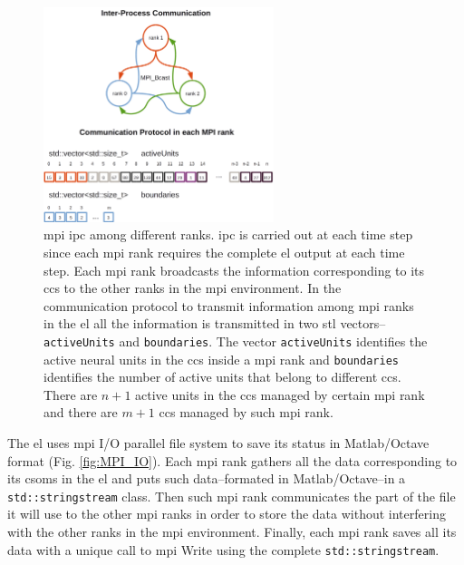 \documentclass[11pt,a4paper]{article}
\begin{document}
\begin{figure}[h!]
    \centering
    \includegraphics[width=0.6\textwidth]{BCast.png}
    \caption{ \gls{mpi} \gls{ipc} among different ranks. \gls{ipc} is carried out at each time step since each \gls{mpi} rank requires the complete \gls{el} output at each time step. Each \gls{mpi} rank broadcasts the information corresponding to its \glspl{cc} to the other ranks in the \gls{mpi} environment. In the communication protocol to transmit information among \gls{mpi} ranks in the \gls{el} all the information is transmitted in two \gls{stl} vectors--\texttt{activeUnits} and \texttt{boundaries}. The vector \texttt{activeUnits} identifies the active neural units in the \glspl{cc} inside a \gls{mpi} rank and \texttt{boundaries} identifies the number of active units that belong to different \glspl{cc}. There are $n+1$ active units in the \glspl{cc} managed by certain \gls{mpi} rank and there are $m+1$ \glspl{cc} managed by such \gls{mpi} rank.}
    \label{fig:BCast}
\end{figure}

The \gls{el} uses \gls{mpi} I/O parallel file system to save its status in Matlab/Octave format (Fig. \ref{fig:MPI_IO}). Each \gls{mpi} rank gathers all the data corresponding to its \glspl{csom} in the \gls{el} and puts such data--formated in Matlab/Octave--in a \texttt{std::stringstream} class. Then such \gls{mpi} rank communicates the part of the file it will use to the other \gls{mpi} ranks in order to store the data without interfering with the other ranks in the \gls{mpi} environment. Finally, each \gls{mpi} rank saves all its data with a unique call to \gls{mpi} Write using the complete \texttt{std::stringstream}.
\end{document}
